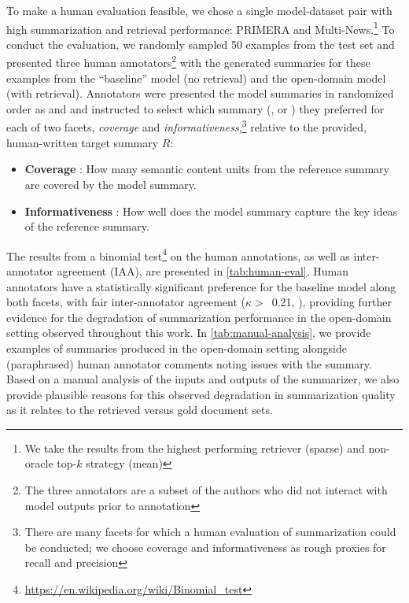 \documentclass[11pt]{article}
\begin{document}
To make a human evaluation feasible, we chose a single model-dataset pair with high summarization and retrieval performance: PRIMERA and Multi-News.\footnote{We take the results from the highest performing retriever (sparse) and non-oracle top-\(k\) strategy (mean)} To conduct the evaluation, we randomly sampled 50 examples from the test set and presented three human annotators\footnote{The three annotators are a subset of the authors who did not interact with model outputs prior to annotation} with the generated summaries for these examples from the ``baseline'' model (no retrieval) and the open-domain model (with retrieval). Annotators were presented the model summaries in randomized order as  and  and instructed to select which summary (,  or ) they preferred for each of two facets, \textit{coverage} and \textit{informativeness},\footnote{There are many facets for which a human evaluation of summarization could be conducted; we choose coverage and informativeness as rough proxies for recall and precision} relative to the provided, human-written target summary \(R\):

\begin{itemize}
    \item \textbf{Coverage} \citep{grusky-etal-2018-newsroom}: How many semantic content units from the reference summary are covered by the model summary.
    \item \textbf{Informativeness} \citep{nenkova-passonneau-2004-evaluating}: How well does the model summary capture the key ideas of the reference summary.
\end{itemize}

\noindent The results from a binomial test\footnote{\url{https://en.wikipedia.org/wiki/Binomial_test}} on the human annotations, as well as inter-annotator agreement (IAA), are presented in \autoref{tab:human-eval}. Human annotators have a statistically significant preference for the baseline model along both facets, with fair inter-annotator agreement (\(\kappa >\)~0.21, \citealp{kappa}), providing further evidence for the degradation of summarization performance in the open-domain setting observed throughout this work. In \autoref{tab:manual-analysis}, we provide examples of summaries produced in the open-domain setting alongside (paraphrased) human annotator comments noting issues with the summary. Based on a manual analysis of the inputs and outputs of the summarizer, we also provide plausible reasons for this observed degradation in summarization quality as it relates to the retrieved versus gold document sets.
\end{document}
